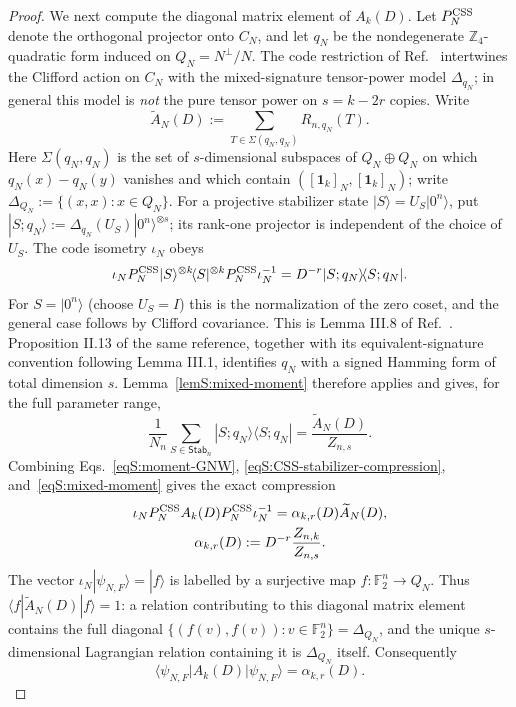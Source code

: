 \documentclass[journal,twocolumn]{IEEEtran}
\theoremstyle{definition}
\theoremstyle{plain}
\newcommand{\F}{\mathbb F}
\newcommand{\Stab}{\mathsf{Stab}}
\newcommand{\one}{\bm 1}
\begin{document}
\begin{proof}
We next compute the diagonal matrix element of $A_k(D)$.  Let
$P_N^{\rm CSS}$ denote the orthogonal projector onto $C_N$, and let $q_N$
be the nondegenerate $\mathbb Z_4$-quadratic form induced on
$Q_N=N^\perp/N$.  The code restriction of
Ref.~\cite{MontealegreGross2025} intertwines the Clifford action on $C_N$
with the mixed-signature tensor-power model $\Delta_{q_N}$; in general this
model is \emph{not} the pure tensor power on $s=k-2r$ copies.  Write
\begin{equation}
 \widetilde A_N(D):=
 \sum_{T\in\Sigma(q_N,q_N)}R_{n,q_N}(T).
 \label{eqS:quotient-relation-sum}
\end{equation}
Here $\Sigma(q_N,q_N)$ is the set of $s$-dimensional subspaces of
$Q_N\oplus Q_N$ on which $q_N(x)-q_N(y)$ vanishes and which contain
$([\one_k]_N,[\one_k]_N)$; write
$\Delta_{Q_N}:=\{(x,x):x\in Q_N\}$.
For a projective stabilizer state $|S\rangle=U_S|0^n\rangle$, put
$|S;q_N\rangle:=\Delta_{q_N}(U_S)|0^n\rangle^{\otimes s}$; its rank-one
projector is independent of the choice of $U_S$.  The code isometry
$\iota_N$ obeys
\begin{equation}
 \iota_NP_N^{\rm CSS}|S\rangle^{\otimes k}
 \!\langle S|^{\otimes k}P_N^{\rm CSS}\iota_N^{-1}
 =D^{-r}|S;q_N\rangle\!\langle S;q_N|.
 \label{eqS:CSS-stabilizer-compression}
\end{equation}
For $S=|0^n\rangle$ (choose $U_S=I$) this is the normalization of the
zero coset, and the general case follows by Clifford covariance.  This is
Lemma III.8 of
Ref.~\cite{MontealegreGross2025}.  Proposition II.13 of the same reference,
together with its equivalent-signature convention following Lemma III.1,
identifies $q_N$ with a signed Hamming form of total dimension $s$.
Lemma~\ref{lemS:mixed-moment} therefore applies and gives, for the full
parameter range,
\begin{equation}
 \frac1{N_n}\sum_{S\in\Stab_n}|S;q_N\rangle\!\langle S;q_N|
 =\frac{\widetilde A_N(D)}{Z_{n,s}}.
 \label{eqS:mixed-moment}
\end{equation}
Combining Eqs.~\eqref{eqS:moment-GNW},
\eqref{eqS:CSS-stabilizer-compression}, and~\eqref{eqS:mixed-moment} gives
the exact compression
\begin{equation}
 \begin{gathered}
 \iota_NP_N^{\rm CSS}A_k(D)P_N^{\rm CSS}\iota_N^{-1}
 =\alpha_{k,r}(D)\widetilde A_N(D),\\
 \alpha_{k,r}(D):=D^{-r}\frac{Z_{n,k}}{Z_{n,s}}.
 \end{gathered}
 \label{eqS:CSS-A-compression}
\end{equation}
The vector $\iota_N|\psi_{N,F}\rangle=|f\rangle$ is labelled by a
surjective map $f:\F_2^n\to Q_N$.  Thus
$\langle f|\widetilde A_N(D)|f\rangle=1$: a relation contributing to this
diagonal matrix element contains the full diagonal
$\{(f(v),f(v)):v\in\F_2^n\}=\Delta_{Q_N}$, and the unique
$s$-dimensional Lagrangian relation containing it is $\Delta_{Q_N}$ itself.
Consequently
\begin{equation}
 \langle\psi_{N,F}|A_k(D)|\psi_{N,F}\rangle
 =\alpha_{k,r}(D).
 \label{eqS:A-diagonal-alpha}
\end{equation}


\end{proof}
\end{document}
